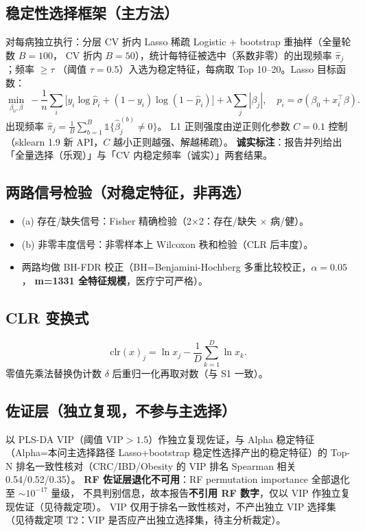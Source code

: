 \documentclass{internal-report}
\begin{document}
\subsection{稳定性选择框架（主方法）}
对每病独立执行：分层 CV 折内 Lasso 稀疏 Logistic + bootstrap 重抽样（全量轮数 $B=100$，
CV 折内 $B=50$），统计每特征被选中（系数非零）的出现频率 $\hat{\pi}_j$；频率 $\ge\tau$
（阈值 $\tau=0.5$）入选为稳定特征，每病取 Top 10--20。Lasso 目标函数：
$$\min_{\beta_0,\beta}\ -\frac{1}{n}\sum_i\big[y_i\log\hat{p}_i+(1-y_i)\log(1-\hat{p}_i)\big]
+\lambda\sum_j|\beta_j|,\quad \hat{p}_i=\sigma(\beta_0+x_i^\top\beta).$$
出现频率 $\hat{\pi}_j=\frac{1}{B}\sum_{b=1}^{B}\mathbb{1}\{\hat{\beta}_j^{(b)}\neq 0\}$。
L1 正则强度由逆正则化参数 $C=0.1$ 控制（sklearn 1.9 新 API，$C$ 越小正则越强、解越稀疏）。
\textbf{诚实标注}：报告并列给出「全量选择（乐观）」与「CV 内稳定频率（诚实）」两套结果。

\subsection{两路信号检验（对稳定特征，非再选）}
\begin{itemize}
  \item (a) 存在/缺失信号：Fisher 精确检验（2×2：存在/缺失 × 病/健）。
  \item (b) 非零丰度信号：非零样本上 Wilcoxon 秩和检验（CLR 后丰度）。
  \item 两路均做 BH-FDR 校正（BH=Benjamini-Hochberg 多重比较校正，$\alpha=0.05$，
        \textbf{m=1331 全特征规模}，医疗宁可严格）。
\end{itemize}

\subsection{CLR 变换式}
$$\mathrm{clr}(x)_j=\ln x_j-\frac{1}{D}\sum_{k=1}^{D}\ln x_k.$$
零值先乘法替换伪计数 $\delta$ 后重归一化再取对数（与 S1 一致）。

\subsection{佐证层（独立复现，不参与主选择）}
以 PLS-DA VIP（阈值 $\mathrm{VIP}>1.5$）作独立复现佐证，与 Alpha 稳定特征
（Alpha=本问主选择路径 Lasso+bootstrap 稳定性选择产出的稳定特征）的
Top-N 排名一致性核对（CRC/IBD/Obesity 的 VIP 排名 Spearman 相关 0.54/0.52/0.35）。
\textbf{RF 佐证层退化不可用}：RF permutation importance 全部退化至 $\sim10^{-17}$ 量级，
不具判别信息，故本报告\textbf{不引用 RF 数字}，仅以 VIP 作独立复现佐证（见待裁定项）。
VIP 仅用于排名一致性核对，不产出独立 VIP 选择集（见待裁定项 T2：VIP 是否应产出独立选择集，待主分析裁定）。
\end{document}
